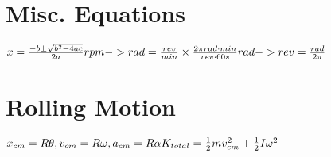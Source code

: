 \documentclass[11pt]{article}
\begin{document}
\begin{paracol}{3}
        \section*{Misc. Equations}
        \begin{fleqn}
            $
            x = \frac{-b \pm \sqrt{b^2-4ac}}{2a} \newline
            rpm -> rad = \frac{rev}{min}\times \frac{2\pi rad \cdot min}{rev \cdot 60s} \newline
            rad -> rev = \frac{rad}{2\pi}
            $
        \end{fleqn}
        \section*{Rolling Motion}
        \begin{fleqn}
            $
            x_{cm} = R\theta, v_{cm} = R\omega, a_{cm} = R\alpha \newline
            K_{total} = \frac12 mv^2_{cm} + \frac12 I \omega^2 \newline
            $
        \end{fleqn}
        \switchcolumn

\end{paracol}
\end{document}
